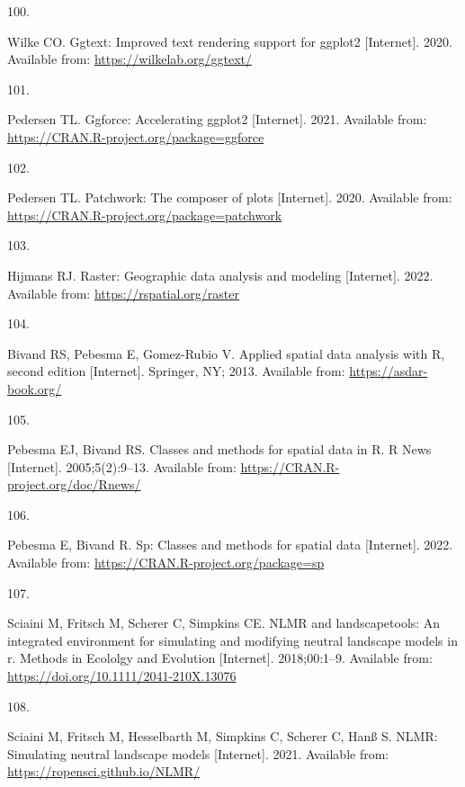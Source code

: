 \documentclass[10pt,a4paper]{article}
\newlength{\cslhangindent}
\newlength{\csllabelwidth}
\newlength{\cslentryspacingunit} %
\newenvironment{CSLReferences}[2] %
 {%
  \setlength{\parindent}{0pt}
  \ifodd #1
  \let\oldpar\par
  \def\par{\hangindent=\cslhangindent\oldpar}
  \fi
  \setlength{\parskip}{#2\cslentryspacingunit}
 }%
 {}
\newcommand{\CSLLeftMargin}[1]{\parbox[t]{\csllabelwidth}{#1}}
\newcommand{\CSLRightInline}[1]{\parbox[t]{\linewidth - \csllabelwidth}{#1}\break}
\begin{document}
\begin{CSLReferences}{0}{0}
\leavevmode{}%
\CSLLeftMargin{100. }
\CSLRightInline{Wilke CO. Ggtext: Improved text rendering support for ggplot2 {[}Internet{]}. 2020. Available from: \url{https://wilkelab.org/ggtext/}}

\leavevmode{}%
\CSLLeftMargin{101. }
\CSLRightInline{Pedersen TL. Ggforce: Accelerating ggplot2 {[}Internet{]}. 2021. Available from: \url{https://CRAN.R-project.org/package=ggforce}}

\leavevmode{}%
\CSLLeftMargin{102. }
\CSLRightInline{Pedersen TL. Patchwork: The composer of plots {[}Internet{]}. 2020. Available from: \url{https://CRAN.R-project.org/package=patchwork}}

\leavevmode{}%
\CSLLeftMargin{103. }
\CSLRightInline{Hijmans RJ. Raster: Geographic data analysis and modeling {[}Internet{]}. 2022. Available from: \url{https://rspatial.org/raster}}

\leavevmode{}%
\CSLLeftMargin{104. }
\CSLRightInline{Bivand RS, Pebesma E, Gomez-Rubio V. Applied spatial data analysis with {R}, second edition {[}Internet{]}. Springer, NY; 2013. Available from: \url{https://asdar-book.org/}}

\leavevmode{}%
\CSLLeftMargin{105. }
\CSLRightInline{Pebesma EJ, Bivand RS. Classes and methods for spatial data in {R}. R News {[}Internet{]}. 2005;5(2):9--13. Available from: \url{https://CRAN.R-project.org/doc/Rnews/}}

\leavevmode{}%
\CSLLeftMargin{106. }
\CSLRightInline{Pebesma E, Bivand R. Sp: Classes and methods for spatial data {[}Internet{]}. 2022. Available from: \url{https://CRAN.R-project.org/package=sp}}

\leavevmode{}%
\CSLLeftMargin{107. }
\CSLRightInline{Sciaini M, Fritsch M, Scherer C, Simpkins CE. NLMR and landscapetools: An integrated environment for simulating and modifying neutral landscape models in r. Methods in Ecololgy and Evolution {[}Internet{]}. 2018;00:1--9. Available from: \url{https://doi.org/10.1111/2041-210X.13076}}

\leavevmode{}%
\CSLLeftMargin{108. }
\CSLRightInline{Sciaini M, Fritsch M, Hesselbarth M, Simpkins C, Scherer C, Hanß S. NLMR: Simulating neutral landscape models {[}Internet{]}. 2021. Available from: \url{https://ropensci.github.io/NLMR/}}


\end{CSLReferences}
\end{document}
